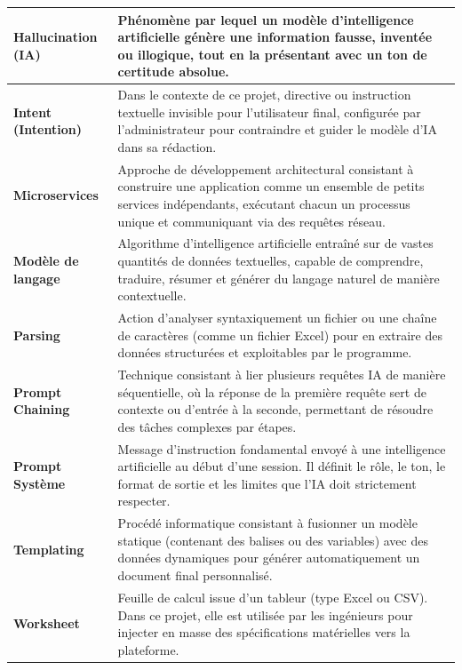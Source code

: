 \documentclass[12pt, a4paper]{report}
\begin{document}
\begin{longtable}{|p{4.5cm}|p{\dimexpr\textwidth-5.1cm}|}
    \hypertarget{glo:6}{}\textbf{Hallucination (IA)} & Phénomène par lequel un modèle d'intelligence artificielle génère une information fausse, inventée ou illogique, tout en la présentant avec un ton de certitude absolue. \\ \hline
    
    \hypertarget{glo:7}{}\textbf{Intent (Intention)} & Dans le contexte de ce projet, directive ou instruction textuelle invisible pour l'utilisateur final, configurée par l'administrateur pour contraindre et guider le modèle d'IA dans sa rédaction. \\ \hline
    
    \hypertarget{glo:8}{}\textbf{Microservices} & Approche de développement architectural consistant à construire une application comme un ensemble de petits services indépendants, exécutant chacun un processus unique et communiquant via des requêtes réseau. \\ \hline
    
    \hypertarget{glo:9}{}\textbf{Modèle de langage} & Algorithme d'intelligence artificielle entraîné sur de vastes quantités de données textuelles, capable de comprendre, traduire, résumer et générer du langage naturel de manière contextuelle. \\ \hline
    
    \hypertarget{glo:10}{}\textbf{Parsing} & Action d'analyser syntaxiquement un fichier ou une chaîne de caractères (comme un fichier Excel) pour en extraire des données structurées et exploitables par le programme. \\ \hline
    
    \hypertarget{glo:11}{}\textbf{Prompt Chaining} & Technique consistant à lier plusieurs requêtes IA de manière séquentielle, où la réponse de la première requête sert de contexte ou d'entrée à la seconde, permettant de résoudre des tâches complexes par étapes. \\ \hline
    
    \hypertarget{glo:12}{}\textbf{Prompt Système} & Message d'instruction fondamental envoyé à une intelligence artificielle au début d'une session. Il définit le rôle, le ton, le format de sortie et les limites que l'IA doit strictement respecter. \\ \hline
    
    \hypertarget{glo:13}{}\textbf{Templating} & Procédé informatique consistant à fusionner un modèle statique (contenant des balises ou des variables) avec des données dynamiques pour générer automatiquement un document final personnalisé. \\ \hline
    
    \hypertarget{glo:14}{}\textbf{Worksheet} & Feuille de calcul issue d'un tableur (type Excel ou CSV). Dans ce projet, elle est utilisée par les ingénieurs pour injecter en masse des spécifications matérielles vers la plateforme. \\ 
\end{longtable}
\end{document}
